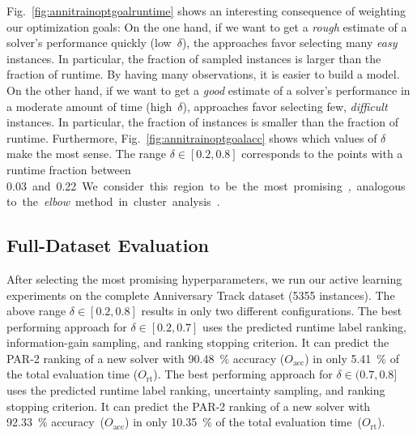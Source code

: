 \documentclass[sn-basic, Numbered]{sn-jnl} %
\begin{document}
Fig.~\ref{fig:annitrainoptgoalruntime} shows an interesting consequence of weighting our optimization goals:
On the one hand, if we want to get a \emph{rough} estimate of a solver's performance quickly (low~$\delta$), the approaches favor selecting many \emph{easy} instances.
In particular, the fraction of sampled instances is larger than the fraction of runtime.
By having many observations, it is easier to build a model.
On the other hand, if we want to get a \emph{good} estimate of a solver's performance in a moderate amount of time (high~$\delta$), approaches favor selecting few, \emph{difficult} instances.
In particular, the fraction of instances is smaller than the fraction of runtime.
Furthermore, Fig.~\ref{fig:annitrainoptgoalacc} shows which values of $\delta$ make the most sense.
The range $\delta \in \left[0.2, 0.8\right]$ corresponds to the points with a runtime fraction between \SI{0.03} and \SI{0.22}.
We consider this region to be the most promising, analogous to the \emph{elbow} method in cluster analysis~\cite{kodinariya2013review}.

\subsection{Full-Dataset Evaluation}
\label{sec:eval:full}

After selecting the most promising hyperparameters, we run our active learning experiments on the complete Anniversary Track dataset (5355 instances).
The above range $\delta \in \left[0.2, 0.8\right]$ results in only two different configurations.
The best performing approach for $\delta \in \left[0.2, 0.7\right]$ uses the predicted runtime label ranking, information-gain sampling, and ranking stopping criterion.
It can predict the PAR-2 ranking of a new solver with \SI{90.48}{\%} accuracy ($O_{\operatorname{acc}}$) in only \SI{5.41}{\%} of the total evaluation time ($O_{\operatorname{rt}}$).
The best performing approach for $\delta \in (0.7, 0.8]$ uses the predicted runtime label ranking, uncertainty sampling, and ranking stopping criterion.
It can predict the PAR-2 ranking of a new solver with \SI{92.33}{\%} accuracy~($O_{\operatorname{acc}}$) in only \SI{10.35}{\%} of the total evaluation time~($O_{\operatorname{rt}}$).
\end{document}
